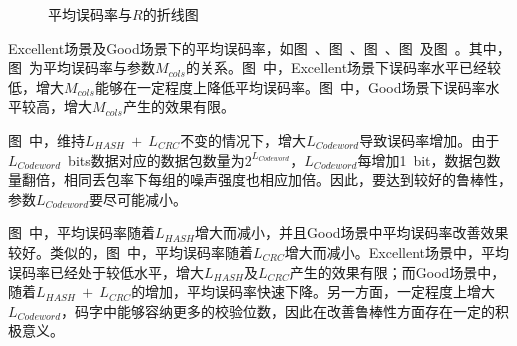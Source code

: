 {    \begin{figure}[htb]
        \centering
        \caption{平均误码率与$R$的折线图}
        \label{fig:5:result:ber:r}
    \end{figure}
}

Excellent场景及Good场景下的平均误码率，如图\ 、图\ 、图\ 、图\ 及图\ 。其中，图\ 为平均误码率与参数$M_{cols}$的关系。图\ 中，Excellent场景下误码率水平已经较低，增大$M_{cols}$能够在一定程度上降低平均误码率。图\ 中，Good场景下误码率水平较高，增大$M_{cols}$产生的效果有限。

图\ 中，维持$L_{HASH}\ +\ L_{CRC}$不变的情况下，增大$L_{Codeword}$导致误码率增加。由于{$L_{Codeword}$\ bits}数据对应的数据包数量为$2^{L_{Codeword}}$，$L_{Codeword}$每增加{1\ bit}，数据包数量翻倍，相同丢包率下每组的噪声强度也相应加倍。因此，要达到较好的鲁棒性，参数$L_{Codeword}$要尽可能减小。

图\ 中，平均误码率随着$L_{HASH}$增大而减小，并且Good场景中平均误码率改善效果较好。类似的，图\ 中，平均误码率随着$L_{CRC}$增大而减小。Excellent场景中，平均误码率已经处于较低水平，增大$L_{HASH}$及$L_{CRC}$产生的效果有限；而Good场景中，随着$L_{HASH}\ +\ L_{CRC}$的增加，平均误码率快速下降。另一方面，一定程度上增大$L_{Codeword}$，码字中能够容纳更多的校验位数，因此在改善鲁棒性方面存在一定的积极意义。

